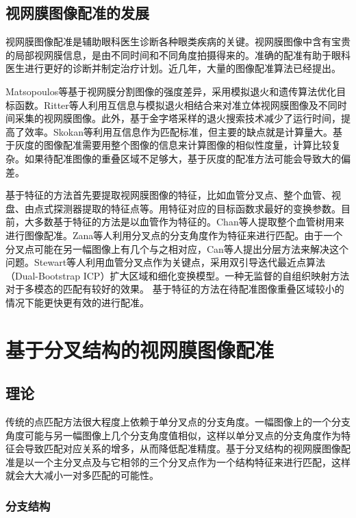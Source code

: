 \documentclass[a4paper,12pt]{article}
\begin{document}
\subsection{视网膜图像配准的发展}

视网膜图像配准是辅助眼科医生诊断各种眼类疾病的关键。视网膜图像中含有宝贵的局部视网膜信息，是由不同时间和不同角度拍摄得来的。准确的配准有助于眼科医生进行更好的诊断并制定治疗计划。近几年，大量的图像配准算法已经提出。

Matsopoulos等基于视网膜分割图像的强度差异，采用模拟退火和遗传算法优化目标函数\cite{5:article}。Ritter等人利用互信息与模拟退火相结合来对准立体视网膜图像及不同时间采集的视网膜图像\cite{6:article}。此外，基于金字塔采样的退火搜索技术减少了运行时间，提高了效率。Skokan等利用互信息作为匹配标准，但主要的缺点就是计算量大\cite{7:article}。基于灰度的图像配准需要用整个图像的信息来计算图像的相似性度量，计算比较复杂。如果待配准图像的重叠区域不足够大，基于灰度的配准方法可能会导致大的偏差。

基于特征的方法首先要提取视网膜图像的特征，比如血管分叉点、整个血管、视盘、由点式探测器提取的特征点等。用特征对应的目标函数求最好的变换参数。目前，大多数基于特征的方法是以血管作为特征的。Chan等人提取整个血管树用来进行图像配准。Zana等人利用分叉点的分支角度作为特征来进行匹配\cite{1:article}。由于一个分叉点可能在另一幅图像上有几个与之相对应，Can等人提出分层方法来解决这个问题\cite{2:article}。Stewart等人利用血管分叉点作为关键点，采用双引导迭代最近点算法（Dual-Bootstrap ICP）扩大区域和细化变换模型\cite{3:article}。一种无监督的自组织映射方法对于多模态的匹配有较好的效果\cite{4:article}。
基于特征的方法在待配准图像重叠区域较小的情况下能更快更有效的进行配准。

\section{基于分叉结构的视网膜图像配准}

\subsection{理论}

传统的点匹配方法很大程度上依赖于单分叉点的分支角度。一幅图像上的一个分支角度可能与另一幅图像上几个分支角度值相似，这样以单分叉点的分支角度作为特征会导致匹配对应关系的增多，从而降低配准精度。基于分叉结构的视网膜图像配准是以一个主分叉点及与它相邻的三个分叉点作为一个结构特征来进行匹配，这样就会大大减小一对多匹配的可能性。

\subsubsection{分支结构}
\end{document}

